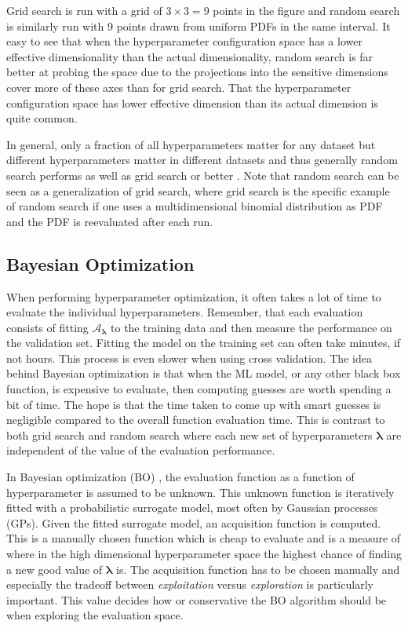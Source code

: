 Grid search is run with a grid of $3\times3 = 9$ points in the figure and random search is similarly run with 9 points drawn from uniform PDFs in the same interval. It easy to see that when the hyperparameter configuration space has a lower effective dimensionality than the actual dimensionality, random search is far better at probing the space due to the projections into the sensitive dimensions cover more of these axes than for grid search. That the hyperparameter configuration space has lower effective dimension than its actual dimension is quite common. 

In general, only a fraction of all hyperparameters matter for any dataset but different hyperparameters matter in different datasets and thus generally random search performs as well as grid search or better \autocite{bergstraRandomSearchHyperparameter2012}. 
Note that random search can be seen as a generalization of grid search, where grid search is the specific example of random search if one uses a multidimensional binomial distribution as PDF and the PDF is reevaluated after each run. 

\subsection{Bayesian Optimization}
\label{subsec:ml:bayesian_optimization}
When performing hyperparameter optimization, it often takes a lot of time to evaluate the individual hyperparameters. Remember, that each evaluation consists of fitting $\mathcal{A}_{\bm{\lambda}}$ to the training data and then measure the performance on the validation set. Fitting the model on the training set can often take minutes, if not hours. This process is even slower when using cross validation. The idea behind Bayesian optimization is that when the ML model, or any other black box function, is expensive to evaluate, then computing  guesses are worth spending a bit of time. The hope is that the time taken to come up with smart guesses is negligible compared to the overall function evaluation time. This is contrast to both grid search and random search where each new set of hyperparameters $\bm{\lambda}$ are independent of the value of the evaluation performance.

In Bayesian optimization (BO) \autocite{brochuTutorialBayesianOptimization2010}, the evaluation function as a function of hyperparameter is assumed to be unknown. This unknown function is iteratively fitted with a probabilistic surrogate model, most often by Gaussian processes (GPs). Given the fitted surrogate model, an acquisition function is computed. This is a manually chosen function which is cheap to evaluate and is a measure of where in the high dimensional hyperparameter space the highest chance of finding a new good value of $\bm{\lambda}$ is. The acquisition function has to be chosen manually and especially the tradeoff between \emph{exploitation} versus \emph{exploration} is particularly important. This value decides how  or conservative the BO algorithm should be when exploring the evaluation space. 


